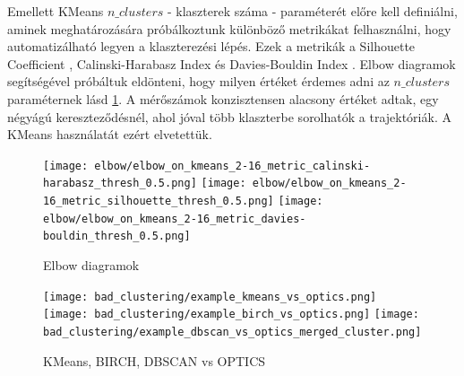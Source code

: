 \documentclass[12pt,a4paper]{article}
\begin{document}
Emellett KMeans $n\_clusters$ - klaszterek száma - paraméterét előre kell definiálni, aminek meghatározására próbálkoztunk különböző metrikákat felhasználni, hogy automatizálható legyen
a klaszterezési lépés. Ezek a metrikák a Silhouette Coefficient \cite{ROUSSEEUW198753}, Calinski-Harabasz Index \cite{10.1080/03610927408827101} és Davies-Bouldin Index \cite{4766909}.
Elbow diagramok segítségével próbáltuk eldönteni, hogy milyen értéket érdemes adni az \begin{math}n\_clusters\end{math} paraméternek lásd \ref{fig: Elbow diagramok}.
A mérőszámok konzisztensen alacsony értéket adtak, egy négyágú kereszteződésnél, ahol jóval több klaszterbe sorolhatók a trajektóriák. A KMeans használatát
ezért elvetettük.

\begin{figure}
    \centering
    \texttt{[image: elbow/elbow\_on\_kmeans\_2-16\_metric\_calinski-harabasz\_thresh\_0.5.png]}
    \centering
    \texttt{[image: elbow/elbow\_on\_kmeans\_2-16\_metric\_silhouette\_thresh\_0.5.png]}
    \centering
    \texttt{[image: elbow/elbow\_on\_kmeans\_2-16\_metric\_davies-bouldin\_thresh\_0.5.png]}

    \caption{Elbow diagramok}
    \label{fig: Elbow diagramok}
\end{figure}

\begin{figure}
    \centering
    \texttt{[image: bad\_clustering/example\_kmeans\_vs\_optics.png]}
    \centering
    \texttt{[image: bad\_clustering/example\_birch\_vs\_optics.png]}
    \centering
    \texttt{[image: bad\_clustering/example\_dbscan\_vs\_optics\_merged\_cluster.png]}

    \caption{KMeans, BIRCH, DBSCAN vs OPTICS}
    \label{fig: Bad clusters}
\end{figure}
\end{document}
